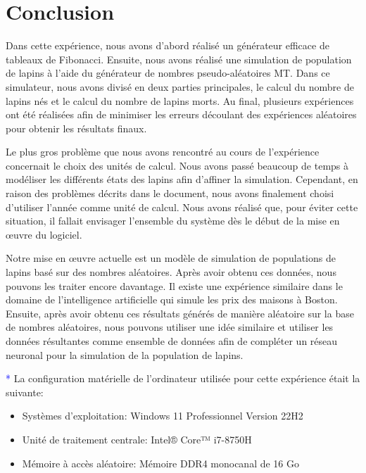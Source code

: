\documentclass[12pt]{article}
\begin{document}
    \section{Conclusion}
    \par
    Dans cette expérience, nous avons d'abord réalisé un générateur efficace de tableaux de Fibonacci. Ensuite, nous avons réalisé une simulation de population de lapins à l'aide du générateur de nombres pseudo-aléatoires MT. Dans ce simulateur, nous avons divisé en deux parties principales, le calcul du nombre de lapins nés et le calcul du nombre de lapins morts. Au final, plusieurs expériences ont été réalisées afin de minimiser les erreurs découlant des expériences aléatoires pour obtenir les résultats finaux.
    \par
    Le plus gros problème que nous avons rencontré au cours de l'expérience concernait le choix des unités de calcul. Nous avons passé beaucoup de temps à modéliser les différents états des lapins afin d'affiner la simulation. Cependant, en raison des problèmes décrits dans le document, nous avons finalement choisi d'utiliser l'année comme unité de calcul. Nous avons réalisé que, pour éviter cette situation, il fallait envisager l'ensemble du système dès le début de la mise en œuvre du logiciel.
    \par
    Notre mise en œuvre actuelle est un modèle de simulation de populations de lapins basé sur des nombres aléatoires. Après avoir obtenu ces données, nous pouvons les traiter encore davantage. Il existe une expérience similaire dans le domaine de l'intelligence artificielle qui simule les prix des maisons à Boston\cite{muralidharan2018analysis}. Ensuite, après avoir obtenu ces résultats générés de manière aléatoire sur la base de nombres aléatoires, nous pouvons utiliser une idée similaire et utiliser les données résultantes comme ensemble de données afin de compléter un réseau neuronal pour la simulation de la population de lapins.

    \newpage	    
    
    
    {\textcolor{blue}{*}} La configuration matérielle de l'ordinateur utilisée pour cette expérience était la suivante:
    \begin{itemize}
        \item Systèmes d'exploitation: Windows 11 Professionnel Version 22H2
        \item Unité de traitement centrale: Intel® Core™ i7-8750H
        \item Mémoire à accès aléatoire: Mémoire DDR4 monocanal de 16 Go
    \end{itemize}
    
    \label{lastPage}
    
\end{document}

